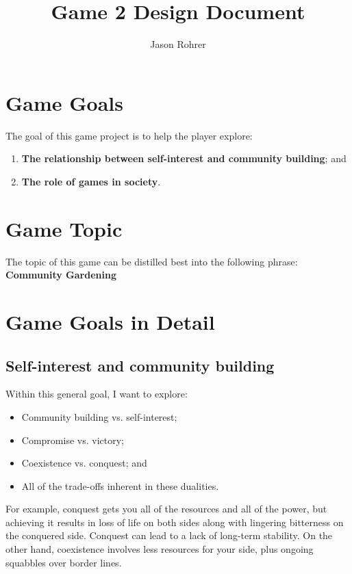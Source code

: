 \documentclass[12pt]{article}
\begin{document}
\title{Game 2 Design Document}

\author{Jason Rohrer}

\maketitle

\begin{abstract}

\end{abstract}


\section{Game Goals}

The goal of this game project is to help the player explore:
\begin{enumerate}
\item {\bf The relationship between self-interest and community building}; and
\item {\bf The role of games in society}.
\end{enumerate}


\section{Game Topic}

The topic of this game can be distilled best into the following phrase:  {\bf Community Gardening}


\section{Game Goals in Detail}

\subsection{Self-interest and community building}

Within this general goal, I want to explore:
\begin{itemize}
\item Community building vs. self-interest;
\item Compromise vs. victory;
\item Coexistence vs. conquest; and
\item All of the trade-offs inherent in these dualities.
\end{itemize}

For example, conquest gets you all of the resources and all of the power, but achieving it results in loss of life on both sides along with lingering bitterness on the conquered side.  
Conquest can lead to a lack of long-term stability.
On the other hand, coexistence involves less resources for your side, plus ongoing squabbles over border lines.
\end{document}
